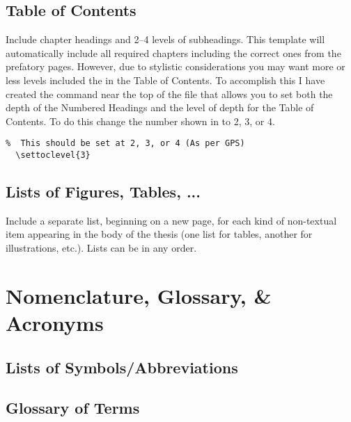 		\subsection{Table of Contents}\label{toc}
			Include chapter headings and 2--4 levels of subheadings. 
			This template will automatically include all required chapters including the correct ones from the prefatory pages.
			However, due to stylistic considerations you may want more or less levels included the in the Table of Contents.
			To accomplish this I have created the command near the top of the  file that allows you to set both the depth of the Numbered Headings and the level of depth for the Table of Contents.
			To do this change the number shown in  to 2, 3, or 4.
			\begin{lstlisting}[float=ht,caption=Set Numbered Heading and ToC Level,label=lst:tocLevels,style=LaTeXStyle,basicstyle=\scriptsize\ttfamily,]
% Option to change the Level of subheading included in the Table of Contents
%  This should be set at 2, 3, or 4 (As per GPS)
  \settoclevel{3}
			\end{lstlisting}


		\subsection{Lists of Figures, Tables, ...}\label{listsof}
			Include a separate list, beginning on a new page, for each kind of non-textual item appearing in the body of the thesis (one list for tables, another for illustrations, etc.). 
			Lists can be in any order.  

	\section{Nomenclature, Glossary, \& Acronyms}\label{nomenclature}\label{glossary}\label{acronyms}
		\subsection{Lists of Symbols/Abbreviations}
			

		\subsection{Glossary of Terms}
			

